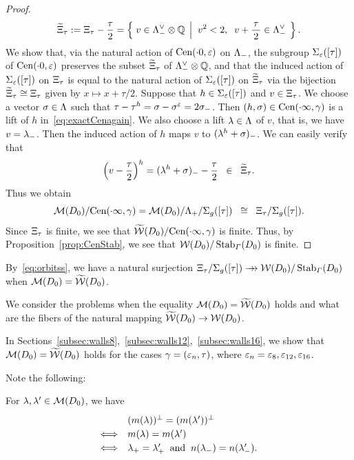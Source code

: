 \documentclass{amsart} %
\begin{document}
\begin{proof}
\begin{equation}
\widetilde{\Xi}_{\tau}:=\Xi_{\tau} -\dfrac{\tau}{2}
=\left\{\; {v\in \Lambda_{-}^{\vee}\otimes\mathord{\mathbb{Q}}} \; \left\vert \; {\;v^2<2, \;\; v+\dfrac{\tau}{\,2\,}\in \Lambda_{-}^{\vee}} \; \right.\right \}.
\end{equation}
%
We show that, via  the natural action of $\mathrm{Cen}(\cdot 0, \varepsilon)$ on $\Lambda_{-}$,
the subgroup 
$\Sigma_{\varepsilon}([\tau])$ of $\mathrm{Cen}(\cdot 0, \varepsilon)$
preserves the subset $\widetilde{\Xi}_{\tau}$ of $\Lambda_{-}^{\vee}\otimes\mathord{\mathbb{Q}}$,
and that 
the induced action of 
$\Sigma_{\varepsilon}([\tau])$ on $\Xi_{\tau}$
is equal to the natural action of $\Sigma_{\varepsilon}([\tau])$ on $\widetilde{\Xi}_{\tau}$
via the 
bijection $\widetilde{\Xi}_{\tau}\cong \Xi_{\tau}$ given by 
$x\mapsto x+\tau/2$.
Suppose that $h\in \Sigma_{\varepsilon}([\tau])$ and $v\in \Xi_{\tau}$.
We choose a vector $\sigma\in \Lambda$ such that  $\tau-\tau^h=\sigma-\sigma^\varepsilon=2\sigma_{-}$.
Then $(h, \sigma)\in \mathrm{Cen}(\cdot \infty, \gamma)$ is a lift of $h$ in~\eqref{eq:exactCenagain}.
We also choose a lift $\lambda\in \Lambda$ of $v$,
that is, we have $v=\lambda\sb{-}$.
Then the induced action of $h$ maps  $v$ to $(\lambda^h+\sigma)\sb{-}$.
We can easily verify that
\[
\left(v-\dfrac{\tau}{2}\right)^h=(\lambda^h+\sigma)_{-}-\dfrac{\tau}{2}\;\;\in\;\;\widetilde{\Xi}_{\tau}.
\]
 Thus we obtain 
%
\begin{equation}\label{eq:orbitss}
 \MMM(D_0)/\Cen(\dotinf, \gamma)= \MMM(D_0)/\Leechplus/\Sigma_{g}([\tau])\;\;\cong\;\; \Xitau/\Sigma_{g}([\tau]). %
\end{equation}
%
Since $\Xi_{\tau}$ is finite, 
 we see that
$\widetilde{\mathord{\mathcal{W}}}(D_0)/\mathrm{Cen}(\cdot \infty, \gamma)$ is finite.
Thus, by Proposition~\ref{prop:CenStab},
we see that $\mathord{\mathcal{W}}(D_0)/\operatorname{Stab}_{\varGamma}(D_0)$ is finite. 
%
\end{proof}
%
\begin{remark}\label{rem:orbitss}
By~\eqref{eq:orbitss},
we have 
a natural surjection 
$ \Xi_{\tau}/\Sigma_{g}([\tau]) \mathrel{\rightarrow\!\!\!\!\rightarrow} \mathord{\mathcal{W}}(D_0)/\operatorname{Stab}_{\varGamma}(D_0)$
when $ \mathord{\mathcal{M}}(D_0)=\widetilde{\mathord{\mathcal{W}}}(D_0)$.
\end{remark}
%
We consider the problems when 
the equality $\mathord{\mathcal{M}}(D_0)=\widetilde{\mathord{\mathcal{W}}} (D_0)$ holds and 
what are the fibers of the natural mapping  $\widetilde{\mathord{\mathcal{W}}} (D_0)\to \mathord{\mathcal{W}}(D_0)$.
%
\begin{remark}
In Sections~\ref{subsec:walls8},~\ref{subsec:walls12},~\ref{subsec:walls16}, 
we show that $\mathord{\mathcal{M}}(D_0)=\widetilde{\mathord{\mathcal{W}}} (D_0)$ holds
for the cases $\gamma=(\varepsilon_n, \tau)$,
where $\varepsilon_n=\varepsilon_8, \varepsilon_{12}, \varepsilon_{16}$.
\end{remark}
%
Note the following:
%
\begin{lemma}\label{lem:mmequal}
For $\lambda, \lambda^{\prime}\in \mathord{\mathcal{M}}(D_0)$, we have 
\[
\renewcommand{\arraystretch}{1.2}
\begin{array}{cl}
&(m(\lambda))\sperp=(m(\lambda\sprime))\sperp\\
\Longleftrightarrow  & m(\lambda)=m(\lambda\sprime) \\
\Longleftrightarrow  & \lambdaplus=\lambdaplus\sprime\;\;\textrm{and}\;\; 
n(\lambdaminus)=n(\lambdaminus\sprime).
\end{array}
\]
\end{lemma}
\end{document}
